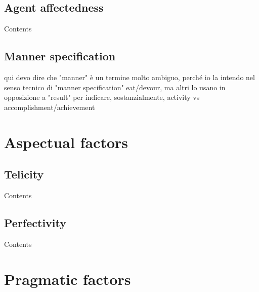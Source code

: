 \subsection{Agent affectedness} 

Contents

\subsection{Manner specification} 

qui devo dire che "manner" è un termine molto ambiguo, perché io la intendo nel senso tecnico di "manner specification" eat/devour, ma altri lo usano in opposizione a "result" per indicare, sostanzialmente, activity vs accomplishment/achievement


\section{Aspectual factors} 


\subsection{Telicity} 

Contents

\subsection{Perfectivity} 

Contents


\section{Pragmatic factors} 



